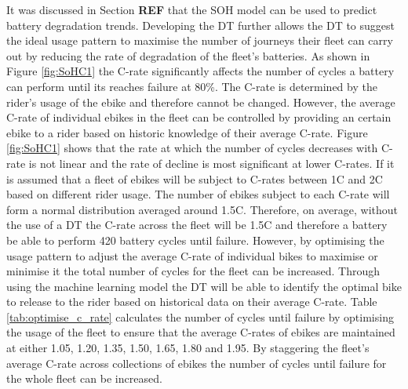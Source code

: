 \documentclass[a4paper, 10pt]{article}
\numberwithin{equation}{section}
\begin{document}
It was discussed in Section \textbf{REF} that the SOH model can be used to predict battery degradation trends. Developing the DT further allows the DT to suggest the ideal usage pattern to maximise the number of journeys their fleet can carry out by reducing the rate of degradation of the fleet's batteries. As shown in Figure \ref{fig:SoHC1} the C-rate significantly affects the number of cycles a battery can perform until its reaches failure at 80\%. The C-rate is determined by the rider's usage of the ebike and therefore cannot be changed. However, the average C-rate of individual ebikes in the fleet can be controlled by providing an certain ebike to a rider based on historic knowledge of their average C-rate. Figure \ref{fig:SoHC1} shows that the rate at which the number of cycles decreases with C-rate is not linear and the rate of decline is most significant at lower C-rates. If it is assumed that a fleet of ebikes will be subject to C-rates between 1C and 2C based on different rider usage. The number of ebikes subject to each C-rate will form a normal distribution averaged around 1.5C. Therefore, on average, without the use of a DT the C-rate across the fleet will be 1.5C and therefore a battery be able to perform 420 battery cycles until failure. However, by optimising the usage pattern to adjust the average C-rate of individual bikes to maximise or minimise it the total number of cycles for the fleet can be increased. Through using the machine learning model the DT will be able to identify the optimal bike to release to the rider based on historical data on their average C-rate. Table \ref{tab:optimise_c_rate} calculates the number of cycles until failure by optimising the usage of the fleet to ensure that the average C-rates of ebikes are maintained at either 1.05, 1.20, 1.35, 1.50, 1.65, 1.80 and 1.95. By staggering the fleet's average C-rate across collections of ebikes the number of cycles until failure for the whole fleet can be increased.
\end{document}
